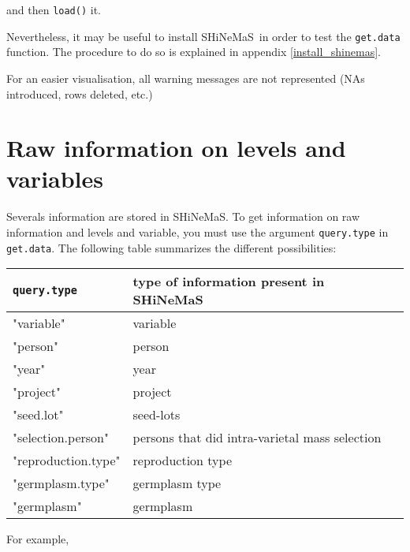 \documentclass{article}\usepackage[]{graphicx}\usepackage[]{color}
\newcommand{\BD}{SHiNeMaS}
\begin{document}
and then \texttt{load()} it.


Nevertheless, it may be useful to install \BD~in order to test the \texttt{get.data} function.
The procedure to do so is explained in appendix \ref{install_shinemas}.

For an easier visualisation, all warning messages are not represented (NAs introduced, rows deleted, etc.)


\newpage


\section{Raw information on levels and variables}
\label{raw}

Severals information are stored in \BD.
To get information on raw information and levels and variable, you must use the argument \texttt{query.type} in \texttt{get.data}.
The following table summarizes the different possibilities:

\begin{center}
\begin{tabular}{ll}
\hline
\texttt{query.type} & type of information present in \BD \\
\hline
"variable" & variable \\
"person" & person \\
"year" & year \\
"project" & project \\
"seed.lot" & seed-lots \\
"selection.person" & persons that did intra-varietal mass selection \\
"reproduction.type" & reproduction type \\
"germplasm.type" & germplasm type \\
"germplasm" & germplasm \\
\hline
\end{tabular}
\end{center}

For example,
\end{document}
